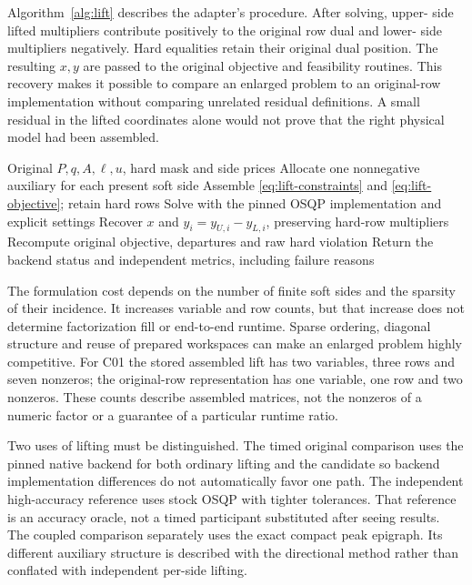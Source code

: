 Algorithm~\ref{alg:lift} describes the adapter's procedure. After solving, upper-
side lifted multipliers contribute positively to the original row dual and lower-
side multipliers negatively. Hard equalities retain their original dual position.
The resulting $x,y$ are passed to the original objective and feasibility routines.
This recovery makes it possible to compare an enlarged problem to an original-row
implementation without comparing unrelated residual definitions. A small residual
in the lifted coordinates alone would not prove that the right physical model
had been assembled.

\begin{algorithm}[htbp]
\caption{Construct an equivalent finite-side lift, solve its ordinary quadratic program and recover the original-space decision and multiplier for independent evaluation.}\label{alg:lift}
\begin{algorithmic}[1]
\Require Original $P,q,A,\ell,u$, hard mask and side prices
\State Allocate one nonnegative auxiliary for each present soft side
\State Assemble \eqref{eq:lift-constraints} and \eqref{eq:lift-objective}; retain hard rows
\State Solve with the pinned OSQP implementation and explicit settings
\State Recover $x$ and $y_i=y_{U,i}-y_{L,i}$, preserving hard-row multipliers
\State Recompute original objective, departures and raw hard violation
\State Return the backend status and independent metrics, including failure reasons
\end{algorithmic}
\end{algorithm}

The formulation cost depends on the number of finite soft sides and the sparsity
of their incidence. It increases variable and row counts, but that increase does
not determine factorization fill or end-to-end runtime. Sparse ordering, diagonal
structure and reuse of prepared workspaces can make an enlarged problem highly
competitive. For C01 the stored assembled lift has two variables, three rows and
seven nonzeros; the original-row representation has one variable, one row and two
nonzeros. These counts describe assembled matrices, not the nonzeros of a numeric
factor or a guarantee of a particular runtime ratio.

Two uses of lifting must be distinguished. The timed original comparison uses
the pinned native backend for both ordinary lifting and the candidate so backend
implementation differences do not automatically favor one path. The independent
high-accuracy reference uses stock OSQP with tighter tolerances. That reference
is an accuracy oracle, not a timed participant substituted after seeing results.
The coupled comparison separately uses the exact compact peak epigraph. Its
different auxiliary structure is described with the directional method rather
than conflated with independent per-side lifting.

